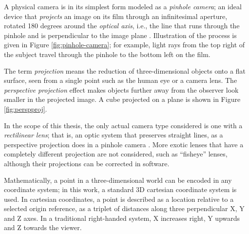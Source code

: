 
A physical camera is in its simplest form modeled as a \emph{pinhole camera}; an ideal device that \emph{projects} an image on its film through an infinitesimal aperture, rotated 180 degrees around the \emph{optical axis}, i.e., the line that runs through the pinhole and is perpendicular to the image plane \cite{greenleaf1950photographic,kingslake1989history}.
Illustration of the process is given in Figure \ref{fig:pinhole-camera}; for example, light rays from the top right of the subject travel through the pinhole to the bottom left on the film.

The term \emph{projection} means the reduction of three-dimensional objects onto a flat surface, seen from a single point such as the human eye or a camera lens.
The \emph{perspective projection} effect makes objects further away from the observer look smaller in the projected image.
A cube projected on a plane is shown in Figure \ref{fig:perspproj}.

In the scope of this thesis, the only actual camera type considered is one with a \emph{rectilinear lens}; that is, an optic system that preserves straight lines, as a perspective projection does in a pinhole camera \cite{greenleaf1950photographic}.
More exotic lenses that have a completely different projection are not considered, such as ``fisheye'' lenses, although their projections can be corrected in software.




Mathematically, a point in a three-dimensional world can be encoded in any coordinate system;
in this work, a standard 3D cartesian coordinate system is used.
In cartesian coordinates, a point is described as a location relative to a selected origin reference, as a triplet of distances along three perpendicular X, Y and Z axes. %
In a traditional right-handed system, X increases right, Y upwards and Z towards the viewer.

